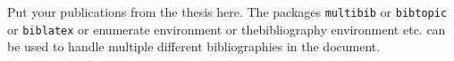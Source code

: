 \listofpublications


\noindent Put your publications from the thesis here. The packages \texttt{multibib} or \texttt{bibtopic} or \texttt{biblatex} or enumerate environment or thebibliography environment etc. can be used to handle multiple different bibliographies in the document.















